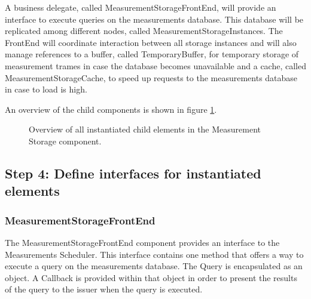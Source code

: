 
\npar A business delegate, called MeasurementStorageFrontEnd, will provide an
interface to execute queries on the measurements database. This database will be
replicated among different nodes, called MeasurementStorageInstances. The
FrontEnd will coordinate interaction between all storage instances and will also
manage references to a buffer, called TemporaryBuffer, for temporary storage of
measurement trames in case the database becomes unavailable and a cache, called
MeasurementStorageCache, to speed up requests to the measurements database in
case to load is high.

\npar An overview of the child components is shown in figure
\ref{fig:it4/elements}.

\begin{figure}[H]
	\begin{centering}
		\caption{Overview of all instantiated child elements in the Measurement
		Storage component.}
		\label{fig:it4/elements}
	\end{centering}
\end{figure}

\subsection{Step 4: Define interfaces for instantiated elements}
\label{add:it4/interfaces}

\subsubsection{MeasurementStorageFrontEnd}

\npar The MeasurementStorageFrontEnd component provides an interface
 to the Measurements Scheduler. This interface
contains one method  that offers a way
to execute a query on the measurements database. The Query is encapsulated as an
object. A Callback is provided within that object in order to present the
results of the query to the issuer when the query is executed.

